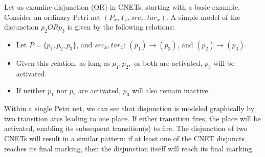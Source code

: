 \begin{example}
  \label{ex:OR-PN}
Let us examine disjunction (OR) in CNETs, starting with a basic example. Consider an ordinary Petri net $(P_x, T_x, src_x, tar_x)$. A simple model of the disjunction $p_2 OR p_3$ is given by the following relations:
  \begin{itemize}
  \item Let $P = \{p_1, p_2, p_3\}$, and $src_x, tar_x$: $(p_1) \to (p_3)$, and $(p_2) \to (p_3)$. 
  \item Given this relation, as long as $p_1, p_2,$ or both are activated, $p_3$ will be activated. 
  \item If neither $p_1$ nor $p_2$ are activated, $p_3$ will also remain inactive.  
  \end{itemize}
Within a single Petri net, we can see that disjunction is modeled graphically by two transition arcs leading to one place. If either transition fires, the place will be activated, enabling its subsequent transition(s) to fire. The disjunction of two CNETs will result in a similar pattern: if at least one of the CNET disjuncts reaches its final marking, then the disjunction itself will reach its final marking.   
\end{example}
